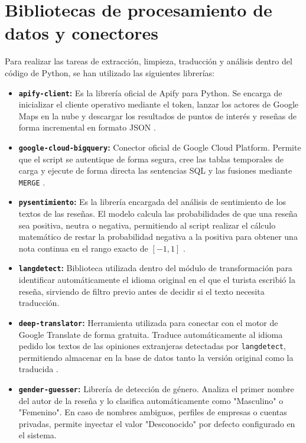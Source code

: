 \section{Bibliotecas de procesamiento de datos y conectores}
Para realizar las tareas de extracción, limpieza, traducción y análisis dentro del código de Python, se han utilizado las siguientes librerías:

\begin{itemize}
    \item \textbf{\texttt{apify-client}:} Es la librería oficial de Apify para Python. Se encarga de inicializar el cliente operativo mediante el token, lanzar los actores de Google Maps en la nube y descargar los resultados de puntos de interés y reseñas de forma incremental en formato JSON \cite{pypi_apify_client}.
    \item \textbf{\texttt{google-cloud-bigquery}:} Conector oficial de Google Cloud Platform. Permite que el script  se autentique de forma segura, cree las tablas temporales de carga y ejecute de forma directa las sentencias SQL y las fusiones mediante \texttt{MERGE} \cite{pypi_bigquery}.
    \item \textbf{\texttt{pysentimiento}:} Es la librería encargada del análisis de sentimiento de los textos de las reseñas. El modelo calcula las probabilidades de que una reseña sea positiva, neutra o negativa, permitiendo al script realizar el cálculo matemático de restar la probabilidad negativa a la positiva para obtener una nota continua en el rango exacto de $[-1, 1]$ \cite{pypi_pysentimiento}.
    \item \textbf{\texttt{langdetect}:} Biblioteca utilizada dentro del módulo de transformación para identificar automáticamente el idioma original en el que el turista escribió la reseña, sirviendo de filtro previo antes de decidir si el texto necesita traducción.
    \item \textbf{\texttt{deep-translator}:} Herramienta utilizada para conectar con el motor de Google Translate de forma gratuita. Traduce automáticamente al idioma pedido los textos de las opiniones extranjeras detectadas por \texttt{langdetect}, permitiendo almacenar en la base de datos tanto la versión original como la traducida \cite{pypi_deep_translator}.
    \item \textbf{\texttt{gender-guesser}:} Librería de detección de género. Analiza el primer nombre del autor de la reseña y lo clasifica automáticamente como "Masculino" o "Femenino". En caso de nombres ambiguos, perfiles de empresas o cuentas privadas, permite inyectar el valor "Desconocido" por defecto configurado en el sistema.
\end{itemize}

